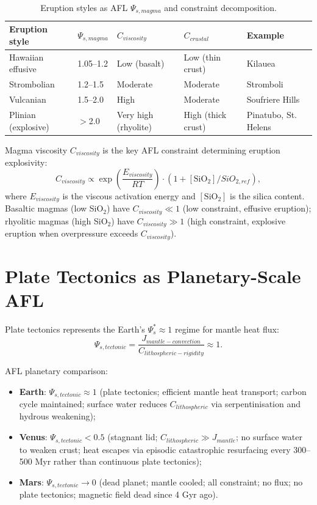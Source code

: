 \documentclass[11pt]{article}
\begin{document}
\begin{table}[h]
\centering
\caption{Eruption styles as AFL $\Psi_{s,magma}$ and constraint decomposition.}
\begin{tabularx}{\textwidth}{@{}lXXXX@{}}
\toprule
Eruption style & $\Psi_{s,magma}$ & $C_{viscosity}$ & $C_{crustal}$ & Example \\
\midrule
Hawaiian effusive & 1.05--1.2 & Low (basalt) & Low (thin crust) & Kilauea \\
Strombolian & 1.2--1.5 & Moderate & Moderate & Stromboli \\
Vulcanian & 1.5--2.0 & High & Moderate & Soufriere Hills \\
Plinian (explosive) & $>$2.0 & Very high (rhyolite) & High (thick crust) & Pinatubo, St. Helens \\
\bottomrule
\end{tabularx}
\end{table}

Magma viscosity $C_{viscosity}$ is the key AFL constraint determining eruption explosivity:
\begin{equation}
C_{viscosity} \propto \exp\left(\frac{E_{viscosity}}{RT}\right) \cdot (1 + [\text{SiO}_2]/SiO_{2,ref}),
\end{equation}
where $E_{viscosity}$ is the viscous activation energy and $[\text{SiO}_2]$ is the silica
content. Basaltic magmas (low SiO$_2$) have $C_{viscosity} \ll 1$ (low constraint, effusive
eruption); rhyolitic magmas (high SiO$_2$) have $C_{viscosity} \gg 1$ (high constraint,
explosive eruption when overpressure exceeds $C_{viscosity}$).

\section{Plate Tectonics as Planetary-Scale AFL}

Plate tectonics represents the Earth's $\Psi_s^* \approx 1$ regime for mantle heat flux:
\begin{equation}
\Psi_{s,tectonic} = \frac{J_{mantle-convection}}{C_{lithospheric-rigidity}} \approx 1.
\end{equation}

AFL planetary comparison:
\begin{itemize}
    \item \textbf{Earth}: $\Psi_{s,tectonic} \approx 1$ (plate tectonics; efficient mantle heat
          transport; carbon cycle maintained; surface water reduces $C_{lithospheric}$ via
          serpentinisation and hydrous weakening);
    \item \textbf{Venus}: $\Psi_{s,tectonic} < 0.5$ (stagnant lid; $C_{lithospheric} \gg J_{mantle}$;
          no surface water to weaken crust; heat escapes via episodic catastrophic resurfacing
          every 300--500 Myr rather than continuous plate tectonics);
    \item \textbf{Mars}: $\Psi_{s,tectonic} \to 0$ (dead planet; mantle cooled; all constraint;
          no flux; no plate tectonics; magnetic field dead since 4 Gyr ago).
\end{itemize}
\end{document}
